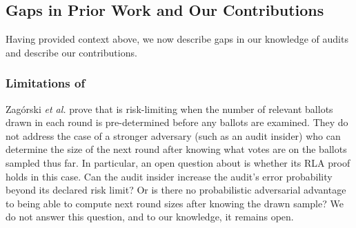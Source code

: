 

\subsection{Gaps in Prior Work and Our Contributions}
Having provided context above, we now describe gaps in our knowledge of audits and describe our contributions. 
\subsubsection{Limitations of \Minerva}
Zag\'{o}rski {\em et al.}  prove that \Minerva \cite{usenix_minerva} is risk-limiting when the number of relevant ballots drawn in each round is pre-determined before any ballots are examined. They do not address the case of a stronger adversary (such as an audit insider) who can determine the size of the next round after knowing what votes are on the ballots sampled thus far. In particular, an open question about \Minerva is whether its RLA proof holds in this case. Can the audit insider increase the audit's error probability beyond its declared risk limit? Or is there no probabilistic adversarial advantage to being able to compute next round sizes after knowing the drawn sample? We do not answer this question, and to our knowledge, it remains open. 

